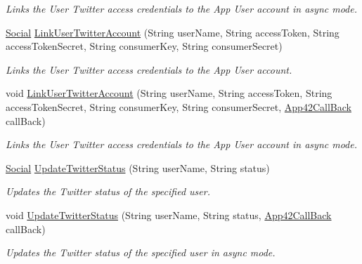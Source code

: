 \begin{DoxyCompactItemize}
\begin{DoxyCompactList}\small\item\em Links the User Twitter access credentials to the App User account in async mode. \end{DoxyCompactList}\item 
\hyperlink{classcom_1_1shephertz_1_1app42_1_1paas_1_1sdk_1_1csharp_1_1social_1_1_social}{Social} \hyperlink{classcom_1_1shephertz_1_1app42_1_1paas_1_1sdk_1_1csharp_1_1social_1_1_social_service_a88c2cca2ae523569e7f08efe7d7ec163}{Link\+User\+Twitter\+Account} (String user\+Name, String access\+Token, String access\+Token\+Secret, String consumer\+Key, String consumer\+Secret)
\begin{DoxyCompactList}\small\item\em Links the User Twitter access credentials to the App User account. \end{DoxyCompactList}\item 
void \hyperlink{classcom_1_1shephertz_1_1app42_1_1paas_1_1sdk_1_1csharp_1_1social_1_1_social_service_a5fc67a953fdf4b6d88dbb35f00a815aa}{Link\+User\+Twitter\+Account} (String user\+Name, String access\+Token, String access\+Token\+Secret, String consumer\+Key, String consumer\+Secret, \hyperlink{interfacecom_1_1shephertz_1_1app42_1_1paas_1_1sdk_1_1csharp_1_1_app42_call_back}{App42\+Call\+Back} call\+Back)
\begin{DoxyCompactList}\small\item\em Links the User Twitter access credentials to the App User account in async mode. \end{DoxyCompactList}\item 
\hyperlink{classcom_1_1shephertz_1_1app42_1_1paas_1_1sdk_1_1csharp_1_1social_1_1_social}{Social} \hyperlink{classcom_1_1shephertz_1_1app42_1_1paas_1_1sdk_1_1csharp_1_1social_1_1_social_service_a4d0c7321aafd4b5fa26c786f7cb3d870}{Update\+Twitter\+Status} (String user\+Name, String status)
\begin{DoxyCompactList}\small\item\em Updates the Twitter status of the specified user. \end{DoxyCompactList}\item 
void \hyperlink{classcom_1_1shephertz_1_1app42_1_1paas_1_1sdk_1_1csharp_1_1social_1_1_social_service_a60d27edf5aca357e5fb36d48ef80ffc4}{Update\+Twitter\+Status} (String user\+Name, String status, \hyperlink{interfacecom_1_1shephertz_1_1app42_1_1paas_1_1sdk_1_1csharp_1_1_app42_call_back}{App42\+Call\+Back} call\+Back)
\begin{DoxyCompactList}\small\item\em Updates the Twitter status of the specified user in async mode. \end{DoxyCompactList}\item 

\end{DoxyCompactItemize}
